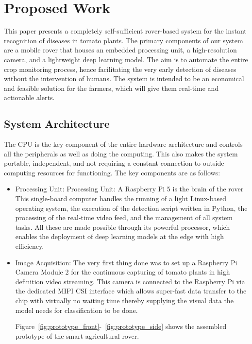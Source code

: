 \documentclass[pdflatex,sn-mathphys-num,iicol]{sn-jnl} %
\theoremstyle{thmstyleone}
\theoremstyle{thmstyletwo}
\theoremstyle{thmstylethree}
\begin{document}
\clearpage  



\section{Proposed Work}
\label{sec:3}

This paper presents a completely self-sufficient rover-based system for the instant recognition of diseases in tomato plants. The primary components of our system are a mobile rover that houses an embedded processing unit, a high-resolution camera, and a lightweight deep learning model. The aim is to automate the entire crop monitoring process, hence facilitating the very early detection of diseases without the intervention of humans. The system is intended to be an economical and feasible solution for the farmers, which will give them real-time and actionable alerts.

\subsection{System Architecture}
The CPU is the key component of the entire hardware architecture and controls all the peripherals as well as doing the computing. This also makes the system portable, independent, and not requiring a constant connection to outside computing resources for functioning. 
The key components are as follows:
\begin{itemize}
    \item Processing Unit: Processing Unit: A Raspberry Pi 5 is the brain of the rover This single-board computer handles the running of a light Linux-based operating system, the execution of the detection script written in Python, the processing of the real-time video feed, and the management of all system tasks. All these are made possible through its powerful processor, which enables the deployment of deep learning models at the edge with high efficiency.

    \item Image Acquisition: The very first thing done was to set up a Raspberry Pi Camera Module 2 for the continuous capturing of tomato plants in high definition video streaming. This camera is connected to the Raspberry Pi via the dedicated MIPI CSI interface which allows super-fast data transfer to the chip with virtually no waiting time thereby supplying the visual data the model needs for classification to be done.

    Figure~\ref{fig:prototype_front}-~\ref{fig:prototype_side} shows the assembled prototype of the smart agricultural rover.
\end{itemize}
\end{document}
